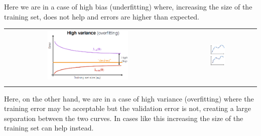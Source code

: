 Here we are in a case of high bias (underfitting) where, increasing the size of the training set, does not help and errors are higher than expected.
\begin{center}
    \begin{tabular}{c c c}
        \\ \includegraphics[width=0.5\textwidth]{images/LearningCurves4.png} & &
        \includegraphics[width=0.2\textwidth]{images/LearningCurves5.png} \\ \\
    \end{tabular}
\end{center}
Here, on the other hand, we are in a case of high variance (overfitting) where the training error may be acceptable but the validation error is not, creating a large separation between the two curves. In cases like this increasing the size of the training set can help instead.

\newpage